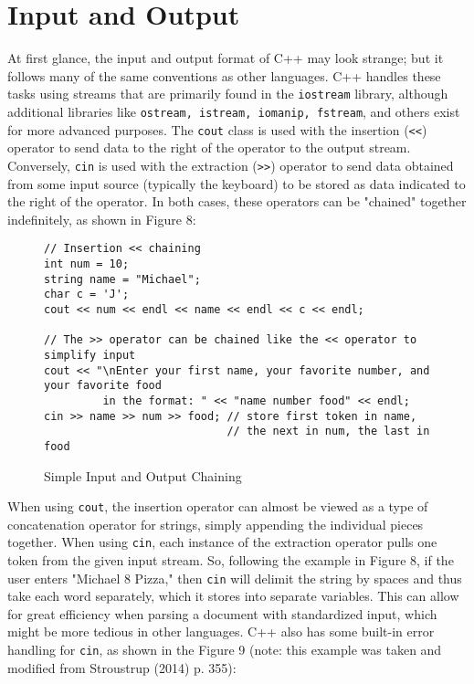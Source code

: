 \documentclass[11pt]{article}
\begin{document}
\section{Input and Output}

	At first glance, the input and output format of C++ may look strange; but it follows many of the same conventions as other languages.  C++ handles these tasks using streams that are primarily found in the \texttt{iostream} library, although additional libraries like \texttt{ostream, istream, iomanip, fstream}, and others exist for more advanced purposes.  The \texttt{cout} class is used with the insertion (\texttt{<<}) operator to send data to the right of the operator to the output stream.  Conversely, \texttt{cin} is used with the extraction (\texttt{>>}) operator to send data obtained from some input source (typically the keyboard) to be stored as data indicated to the right of the operator.  In both cases, these operators can be "chained" together indefinitely, as shown in Figure 8:
	
\begin{figure}[!h]
\centering
\begin{BVerbatim}
// Insertion << chaining
int num = 10;
string name = "Michael";
char c = 'J';
cout << num << endl << name << endl << c << endl;

// The >> operator can be chained like the << operator to simplify input
cout << "\nEnter your first name, your favorite number, and your favorite food 
         in the format: " << "name number food" << endl;
cin >> name >> num >> food; // store first token in name, 
                            // the next in num, the last in food
\end{BVerbatim}
\caption{Simple Input and Output Chaining}
\end{figure} \FloatBarrier

When using \texttt{cout}, the insertion operator can almost be viewed as a type of concatenation operator for strings, simply appending the individual pieces together.  When using \texttt{cin}, each instance of the extraction operator pulls one token from the given input stream.  So, following the example in Figure 8, if the user enters "Michael 8 Pizza," then \texttt{cin} will delimit the string by spaces and thus take each word separately, which it stores into separate variables.  This can allow for great efficiency when parsing a document with standardized input, which might be more tedious in other languages.  C++ also has some built-in error handling for \texttt{cin}, as shown in the Figure 9 (note: this example was taken and modified from Stroustrup (2014) p. 355):
\end{document}
